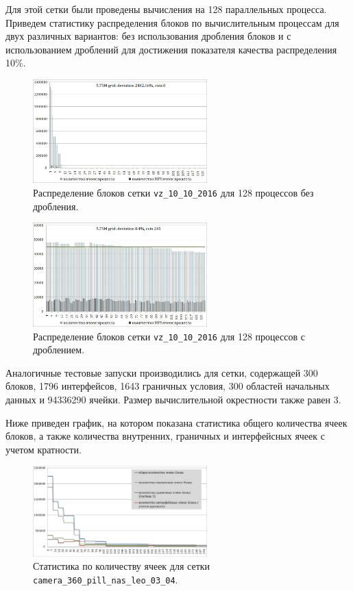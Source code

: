 Для этой сетки были проведены вычисления на 128 параллельных процесса.
Приведем статистику распределения блоков по вычислительным процессам для двух различных вариантов: без использования дробления блоков и с использованием дроблений для достижения показателя качества распределения 10\%.

\begin{figure}[ht]
	\centering
	\includegraphics[width=0.6\textwidth]{./pics/text_2_withcut/chart4.jpg}
	\caption{Распределение блоков сетки \texttt{vz\_10\_10\_2016} для 128 процессов без дробления.}
	\label{fig:text_2_withcut_chart4}
\end{figure}

\begin{figure}[ht]
	\centering
	\includegraphics[width=0.6\textwidth]{./pics/text_2_withcut/chart5.jpg}
	\caption{Распределение блоков сетки \texttt{vz\_10\_10\_2016} для 128 процессов с дроблением.}
	\label{fig:text_2_withcut_chart5}
\end{figure}

Аналогичные тестовые запуски производились для сетки, содержащей 300 блоков, 1796 интерфейсов, 1643 граничных условия, 300 областей начальных данных и 94336290 ячейки.
Размер вычислительной окрестности также равен 3.

Ниже приведен график, на котором показана статистика общего количества ячеек блоков, а также количества внутренних, граничных и интерфейсных ячеек с учетом кратности.

\begin{figure}[ht]
	\centering
	\includegraphics[width=0.6\textwidth]{./pics/text_2_withcut/chart6.jpg}
	\caption{Статистика по количеству ячеек для сетки \texttt{camera\_360\_pill\_nas\_leo\_03\_04}.}
	\label{fig:text_2_withcut_chart6}
\end{figure}

